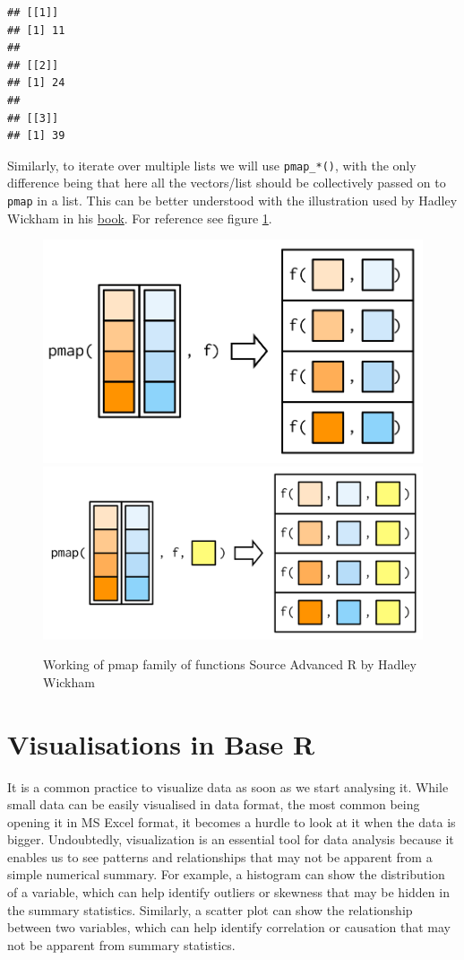 \documentclass[
]{book}
\begin{document}
\begin{verbatim}
## [[1]]
## [1] 11
## 
## [[2]]
## [1] 24
## 
## [[3]]
## [1] 39
\end{verbatim}

Similarly, to iterate over multiple lists we will use \texttt{pmap\_*()}, with the only difference being that here all the vectors/list should be collectively passed on to \texttt{pmap} in a list. This can be better understood with the illustration used by Hadley Wickham in his \href{https://adv-r.hadley.nz/functionals.html}{book}. For reference see figure \ref{fig:pmap}.

\begin{figure}

{\centering \includegraphics[width=0.49\linewidth]{images/pmap} \includegraphics[width=0.49\linewidth]{images/pmap-arg} 

}

\caption{Working of pmap family of functions \hspace{\textwidth} Source Advanced R by Hadley Wickham}\label{fig:pmap}
\end{figure}

\hypertarget{visualisations-in-base-r}{%
\chapter{Visualisations in Base R}\label{visualisations-in-base-r}}

It is a common practice to visualize data as soon as we start analysing it. While small data can be easily visualised in data format, the most common being opening it in MS Excel format, it becomes a hurdle to look at it when the data is bigger. Undoubtedly, visualization is an essential tool for data analysis because it enables us to see patterns and relationships that may not be apparent from a simple numerical summary. For example, a histogram can show the distribution of a variable, which can help identify outliers or skewness that may be hidden in the summary statistics. Similarly, a scatter plot can show the relationship between two variables, which can help identify correlation or causation that may not be apparent from summary statistics.
\end{document}
